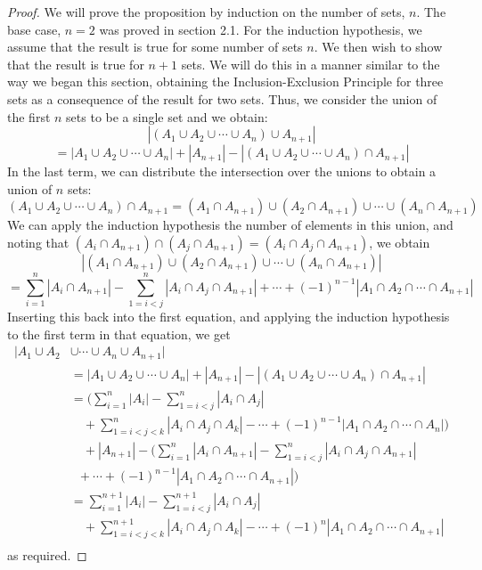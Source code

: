 \documentclass[handout]{ximera}
\begin{document}
\begin{proof}
We will prove the proposition by induction on the number of sets, $n$. The base case, $n=2$ was proved in section 2.1.
For the induction hypothesis, we assume that the result is true for some number of sets $n$. 
We then wish to show that the result is true for $n+1$ sets. We will do this in a manner similar to the way we began
this section, obtaining the Inclusion-Exclusion Principle for three sets as a consequence of the result for two sets.
Thus, we consider the union of the first $n$ sets to be a single set and we obtain:
\[
|(A_1 \cup A_2 \cup \cdots \cup A_n) \cup A_{n+1}| 
\]
\[
= |A_1 \cup A_2 \cup \cdots \cup A_n| + |A_{n+1}| - 
|(A_1 \cup A_2 \cup \cdots \cup A_n) \cap A_{n+1}|
\]
In the last term, we can distribute the intersection over the unions to obtain a union of $n$ sets:
\[
(A_1 \cup A_2 \cup \cdots \cup A_n) \cap A_{n+1} = 
(A_1 \cap A_{n+1}) \cup (A_2 \cap A_{n+1}) \cup \cdots \cup (A_n \cap A_{n+1})
\]
We can apply the induction hypothesis the number of elements in this union, and noting 
that $(A_i \cap A_{n+1}) \cap (A_j \cap A_{n+1})  = (A_i \cap A_j \cap A_{n+1})$, we obtain
\[
|(A_1 \cap A_{n+1}) \cup (A_2 \cap A_{n+1}) \cup \cdots \cup (A_n \cap A_{n+1})|
\]
\[
= \sum_{i = 1}^n |A_i \cap A_{n+1}| - \sum_{1 = i < j}^n |A_i \cap A_j \cap A_{n+1}| + \cdots + (-1)^{n-1} |A_1 \cap A_2 \cap \cdots \cap A_{n+1}|
\]
Inserting this back into the first equation, and applying the induction hypothesis to the 
first term in that equation, we get
\begin{align*}
|A_1 \cup A_2 &\cup \cdots \cup A_n \cup A_{n+1}|   \\[6 pt]
& =|A_1 \cup A_2 \cup \cdots \cup A_n| + |A_{n+1}| - |(A_1 \cup A_2 \cup \cdots \cup A_n) \cap A_{n+1}| \\[7 pt]
 &= \bigg( \sum_{i =1}^n |A_i| - \sum_{1 =i<j}^n |A_i\cap A_j| \\
 &\quad +\sum_{1 =i<j< k}^n |A_i\cap A_j \cap A_k| - \cdots + (-1)^{n-1} |A_1 \cap A_2 \cap \cdots \cap A_n|\bigg) \\
  &\quad+ |A_{n+1}| - \bigg(\sum_{i = 1}^n |A_i \cap A_{n+1}| - \sum_{1 = i < j}^n |A_i \cap A_j \cap A_{n+1}| \\
  &\;\;+ \cdots + (-1)^{n-1} |A_1 \cap A_2 \cap \cdots \cap A_{n+1}|\bigg)\\
  &= \sum_{i =1}^{n+1} |A_i| - \sum_{1 =i<j}^{n+1} |A_i\cap A_j| \\
& \quad +\sum_{1 =i<j< k}^{n+1} |A_i\cap A_j \cap A_k| - \cdots + (-1)^{n} |A_1 \cap A_2 \cap \cdots \cap A_{n+1}| \\
\end{align*}
as required.

\end{proof}
\end{document}
